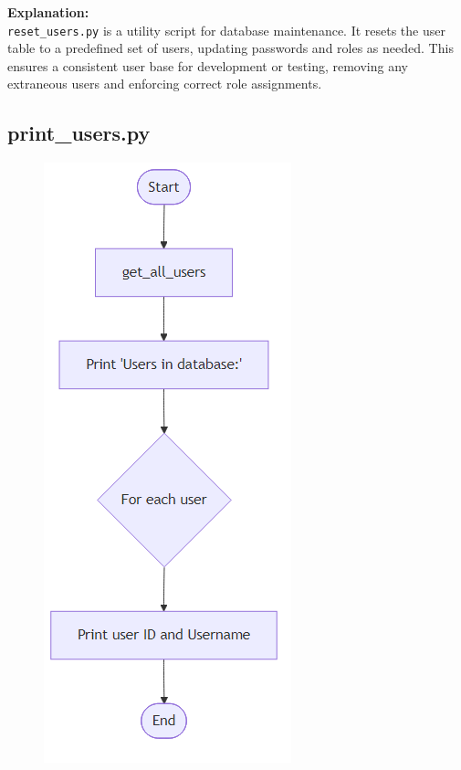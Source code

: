 \documentclass{report}
\begin{document}
\noindent
\textbf{Explanation:} \\
\texttt{reset\_users.py} is a utility script for database maintenance. It resets the user table to a predefined set of users, updating passwords and roles as needed. This ensures a consistent user base for development or testing, removing any extraneous users and enforcing correct role assignments.

\subsection{print\_users.py}

\begin{figure}[h]
    \centering
    \includegraphics[width=\textwidth,height=0.8\textheight,keepaspectratio]{png_files/print_users_flow.png}

\end{figure}
\end{document}

